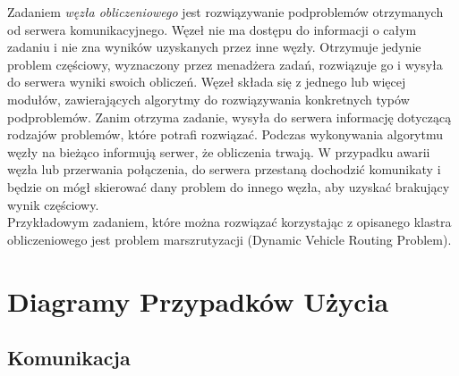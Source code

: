 \documentclass[12pt,a4paper,titlepage]{report}
\begin{document}
Zadaniem \textit{węzła obliczeniowego} jest rozwiązywanie podproblemów otrzymanych od serwera komunikacyjnego. Węzeł nie ma dostępu do informacji o całym zadaniu i nie zna wyników uzyskanych przez inne węzły. Otrzymuje jedynie problem częściowy, wyznaczony przez menadżera zadań, rozwiązuje go i wysyła do serwera wyniki swoich obliczeń. Węzeł składa się z jednego lub więcej modułów, zawierających algorytmy do rozwiązywania konkretnych typów podproblemów. Zanim otrzyma zadanie, wysyła do serwera informację dotyczącą rodzajów problemów, które potrafi rozwiązać. Podczas wykonywania algorytmu węzły na bieżąco informują serwer, że obliczenia trwają. W przypadku awarii węzła lub przerwania połączenia, do serwera przestaną dochodzić komunikaty i będzie on mógł skierować dany problem do innego węzła, aby uzyskać brakujący wynik częściowy.\\
Przykładowym zadaniem, które można rozwiązać korzystając z opisanego klastra obliczeniowego jest problem marszrutyzacji (Dynamic Vehicle Routing Problem).


	\chapter{Diagramy Przypadków Użycia}
		\section{Komunikacja}
\end{document}
